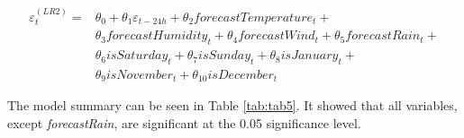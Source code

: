 \documentclass[mstat,12pt]{unswthesis}
\begin{document}
\begin{equation}
\begin{split}
\varepsilon^{(LR2)}_{t} = &\theta_0 + \theta_1\varepsilon_{t-24h} +\theta_{2}forecastTemperature_t + \\
& \theta_{3}forecastHumidity_t + \theta_{4}forecastWind_t + \theta_{5}forecastRain_t + \\
& \theta_{6}isSaturday_t + \theta_{7}isSunday_t + \theta_{8}isJanuary_t + \\
& \theta_{9}isNovember_t + \theta_{10}isDecember_t
\end{split}
\label{eq:oneE}
\end{equation}

The model summary can be seen in Table \ref{tab:tab5}. It showed that all variables, except \textit{forecastRain}, are significant at the 0.05 significance level.
\end{document}
